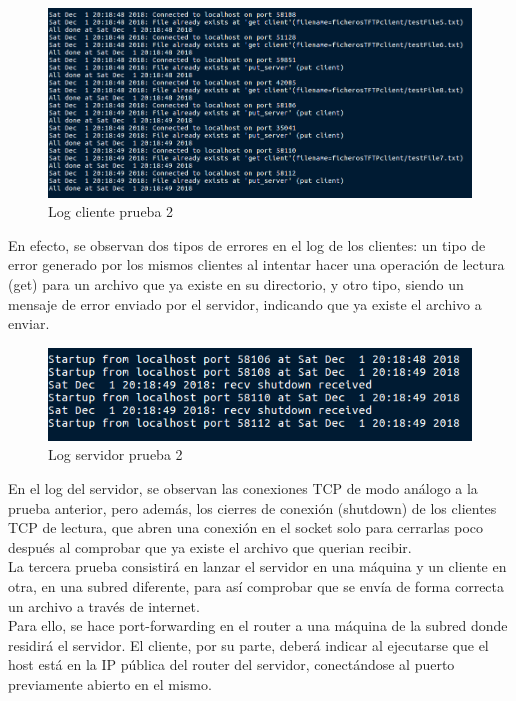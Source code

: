 \documentclass[journal, a4paper]{IEEEtran}
\begin{document}
\begin{figure}[H]
\centering
\includegraphics[scale=0.4]{images/log_cliente_prueba_2}
\caption{Log cliente prueba 2}
\end{figure}

En efecto, se observan dos tipos de errores en el log de los clientes: un tipo de error generado por los mismos clientes al intentar  hacer una operación de lectura (get) para un archivo que ya existe en su directorio, y otro tipo, siendo un mensaje de error enviado por el servidor, indicando que ya existe el archivo a enviar.

\begin{figure}[H]
\centering
\includegraphics[scale=0.6]{images/log_server_prueba_2}
\caption{Log servidor prueba 2}
\end{figure}

En el log del servidor, se observan las conexiones TCP de modo análogo a la prueba anterior, pero además, los cierres de conexión (shutdown) de los clientes TCP de lectura, que abren una conexión en el socket solo para cerrarlas poco después al comprobar que ya existe el archivo que querian recibir.\\

La tercera prueba consistirá en lanzar el servidor en una máquina y un cliente en otra, en una subred diferente, para así comprobar que se envía de forma correcta un archivo a través de internet.\\

Para ello, se hace port-forwarding en el router a una máquina de la subred donde residirá el servidor. El cliente, por su parte, deberá indicar al ejecutarse que el host está en la IP pública del router del servidor, conectándose al puerto previamente abierto en el mismo.

\end{document}
